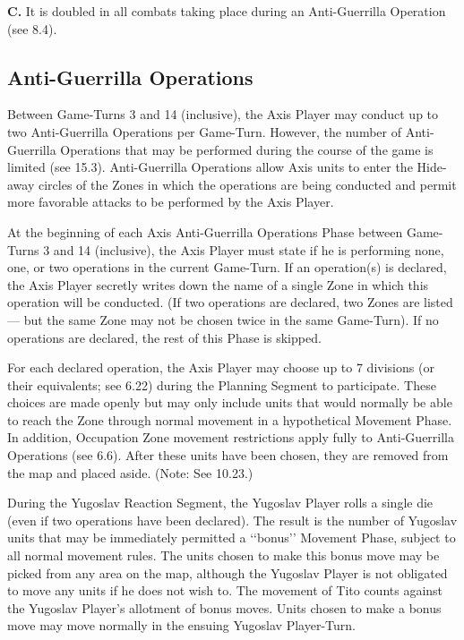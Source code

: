 \textbf{C.} It is doubled in all combats taking place during an Anti-Guerrilla Operation (see 8.4).

\subsection{Anti-Guerrilla Operations}\label{sec:8.4}

Between Game-Turns 3 and 14 (inclusive), the Axis Player may conduct up to two
Anti-Guerrilla Operations per Game-Turn. However, the number of Anti-Guerrilla
Operations that may be performed during the course of the game is limited (see
15.3). Anti-Guerrilla Operations allow Axis units to enter the Hide-away circles
of the Zones in which the operations are being conducted and permit more
favorable attacks to be performed by the Axis Player.

 At the beginning of each Axis Anti-Guerrilla Operations Phase between Game-Turns 3 and 14 (inclusive), the Axis Player must state if he is performing none, one, or two operations in the current Game-Turn. If an operation(s) is declared, the Axis Player secretly writes down the name of a single Zone in which this operation will be conducted. (If two operations are declared, two Zones are listed — but the same Zone may not be chosen twice in the same Game-Turn). If no operations are declared, the rest of this Phase is skipped.

 For each declared operation, the Axis Player may choose up to 7 divisions (or their equivalents; see 6.22) during the Planning Segment to participate. These choices are made openly but may only include units that would normally be able to reach the Zone through normal movement in a hypothetical Movement Phase. In addition, Occupation Zone movement restrictions apply fully to Anti-Guerrilla Operations (see 6.6). After these units have been chosen, they are removed from the map and placed aside. (Note: See 10.23.)

 During the Yugoslav Reaction Segment, the Yugoslav Player rolls a single die (even if two operations have been declared). The result is the number of Yugoslav units that may be immediately permitted a ‘‘bonus’’ Movement Phase, subject to all normal movement rules. The units chosen to make this bonus move may be picked from any area on the map, although the Yugoslav
Player is not obligated to move any units if he does not wish to. The movement
of Tito counts against the Yugoslav Player’s allotment of bonus moves. Units
chosen to make a bonus move may move normally in the ensuing Yugoslav
Player-Turn.

